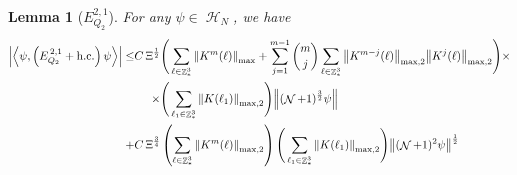 \documentclass[sn-mathphys, Numbered ,a4paper]{sn-jnl}%
\DeclareMathOperator{\Z}{\mathbb{Z}}
\DeclareMathOperator{\HH}{\mathcal{H}}
\DeclareMathOperator{\NN}{\mathcal{N}}
\newcommand{\half}{\frac{1}{2}}
\newcommand{\eva}[1]{\left\langle #1 \right\rangle}
\theoremstyle{plain}
\newtheorem{lemma}[theorem]{Lemma}
\theoremstyle{definition}
\theoremstyle{remark}
\theoremstyle{plain}
\theoremstyle{definition}
\theoremstyle{remark}
\begin{document}
\begin{lemma}[$E_{Q_2}^{2,1}$]
    For any $\psi \in \HH_N$, we have
    \begin{alignat}{2}
    	\abs{\eva{\psi,\left(E^{\,2,1}_{Q_2}+\mathrm{h.c.}\right) \psi }}
    	\leq  &C\, \begin{aligned}[t]\Xi^{\half}\Bigg( &\sum\limits_{\ell \in \Z^3_*} \norm{K^m(\ell)}_{\mathrm{max}} +\sum\limits_{j=1}^{m-1} {{m}\choose{j}} \sum\limits_{\ell \in \Z^3_*} \norm{K^{m-j}(\ell)}_{\mathrm{max,2}} \norm{K^{j}(\ell)}_{\mathrm{max,2}} \Bigg)\times \nonumber\\ \times \Bigg(&\sum\limits_{\ell_1 \in \Z^3_*} \norm{K(\ell_1)}_{\mathrm{max,2}} \Bigg)\norm { (\NN+1)^{\frac{3}{2}} \psi } \nonumber\\
    	\end{aligned}\\
    	\;+ &C\,\Xi^{\frac{3}{4}} \left(\sum\limits_{\ell \in \Z^3_*} \norm{K^m(\ell)}_{\mathrm{max,2}}\right) \Bigg(\sum\limits_{\ell_1 \in \Z^3_*} \norm{K(\ell_1)}_{\mathrm{max,2}} \Bigg)  \norm{ (\NN+1)^2\psi}^\half\label{eq:estEQ221}
    \end{alignat}
\end{lemma}
\end{document}
